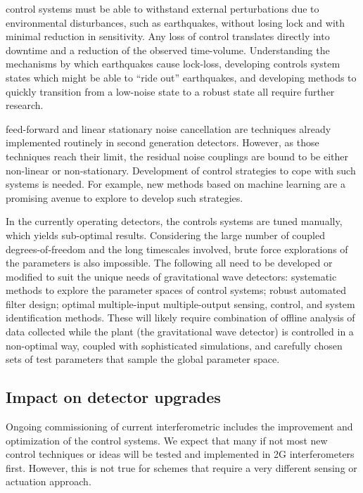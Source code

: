 {} control systems must be able to withstand external perturbations due to environmental disturbances, such as earthquakes, without losing lock and with minimal reduction in sensitivity. Any loss of control translates directly into downtime and a reduction of the observed time-volume. Understanding the mechanisms by which earthquakes cause lock-loss, developing controls system states which might be able to ``ride out'' earthquakes, and developing methods to quickly transition from a low-noise state to a robust state all require further research.\par
{} feed-forward and linear stationary noise cancellation are techniques already implemented routinely in second generation detectors. However, as those techniques reach their limit, the residual noise couplings are bound to be either non-linear or non-stationary. Development of control strategies to cope with such systems is needed. For example, new methods based on machine learning are a promising avenue to explore to develop such strategies.\par
{} In the currently operating detectors, the controls systems are tuned manually, which yields sub-optimal results.  Considering the large number of coupled degrees-of-freedom and the long timescales involved, brute force explorations of the parameters is also impossible. The following all need to be developed or modified to suit the unique needs of gravitational wave detectors: systematic methods to explore the parameter spaces of control systems; robust automated filter design; optimal multiple-input multiple-output sensing, control, and system identification methods. These will likely require combination of offline analysis of data collected while the plant (the gravitational wave detector) is controlled in a non-optimal way, coupled with sophisticated simulations, and carefully chosen sets of test parameters that sample the global parameter space.

\subsection{Impact on detector upgrades}
Ongoing commissioning of current interferometric includes the improvement and optimization of the control systems. We expect that many if not most new control techniques or ideas will be tested and implemented in 2G interferometers first. However, this is not true for schemes that require a very different sensing or actuation approach.

